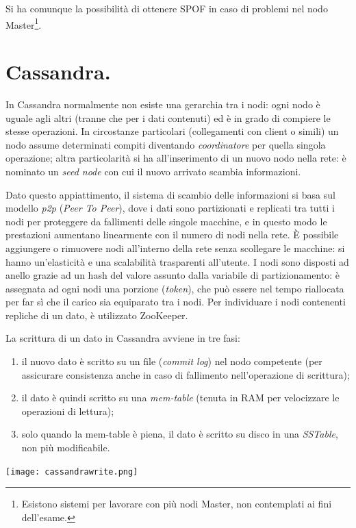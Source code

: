\documentclass[a4page, 11pt]{article}
\begin{document}
Si ha comunque la possibilità di ottenere SPOF in caso di problemi nel nodo Master\footnote{Esistono sistemi per lavorare con più nodi Master, non contemplati ai fini dell'esame.}.

\section{Cassandra.}
In Cassandra normalmente non esiste una gerarchia tra i nodi: ogni nodo è uguale agli altri (tranne che per i dati contenuti) ed è in grado di compiere le stesse operazioni.
In circostanze particolari (collegamenti con client o simili) un nodo assume determinati compiti diventando \textit{coordinatore} per quella singola operazione; altra particolarità si ha all'inserimento di un nuovo nodo nella rete: è nominato un \textit{seed node} con cui il nuovo arrivato scambia informazioni.

Dato questo appiattimento, il sistema di scambio delle informazioni si basa sul modello \textit{p2p} (\textit{Peer To Peer}), dove i dati sono partizionati e replicati tra tutti i nodi per proteggere da fallimenti delle singole macchine, e in questo modo le prestazioni aumentano linearmente con il numero di nodi nella rete.
È possibile aggiungere o rimuovere nodi all'interno della rete senza scollegare le macchine: si hanno un'elasticità e una scalabilità trasparenti all'utente.
I nodi sono disposti ad anello grazie ad un hash del valore assunto dalla variabile di partizionamento: è assegnata ad ogni nodi una porzione (\textit{token}), che può essere nel tempo riallocata per far sì che il carico sia equiparato tra i nodi.
Per individuare i nodi contenenti repliche di un dato, è utilizzato ZooKeeper.

La scrittura di un dato in Cassandra avviene in tre fasi:
\begin{enumerate}
\item il nuovo dato è scritto su un file (\textit{commit log}) nel nodo competente (per assicurare consistenza anche in caso di fallimento nell'operazione di scrittura);
\item il dato è quindi scritto su una \textit{mem-table} (tenuta in RAM per velocizzare le operazioni di lettura);
\item solo quando la mem-table è piena, il dato è scritto su disco in una \textit{SSTable}, non più modificabile.
\end{enumerate}
\begin{center}
  \texttt{[image: cassandrawrite.png]}
\end{center}
\end{document}
